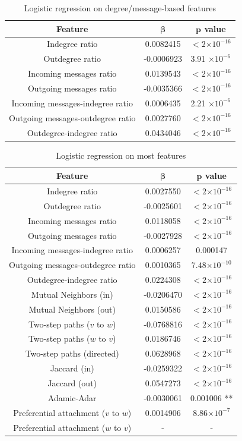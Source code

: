 \documentclass[conference]{IEEEtran}
\providecommand{\e}[1]{\ensuremath{\times 10^{#1}}}
\begin{document}
\begin{table}[!t]
\renewcommand{\arraystretch}{1.3}
\caption{Logistic regression on degree/message-based features}
\label{table_recresults_logr}
\centering
\begin{tabular}{|c||c|c|}
\hline
\bf{Feature} & $\mathbf{\beta}$ & $\mathbf{p}$ value \\
\hline
Indegree ratio & 0.0082415 & $< 2 \e{-16} $ \\
Outdegree ratio & -0.0006923 & 3.91 \e{-6} \\
Incoming messages ratio & 0.0139543 & $< 2 \e{-16} $ \\
Outgoing messages ratio & -0.0035366 & $< 2 \e{-16} $ \\
Incoming messages-indegree ratio & 0.0006435 & 2.21 \e{-6} \\
Outgoing messages-outdegree ratio & 0.0027760 & $< 2 \e{-16} $ \\
Outdegree-indegree ratio & 0.0434046 & $< 2 \e{-16} $ \\
\hline
\end{tabular}
\end{table}

\begin{table}[!t]
\renewcommand{\arraystretch}{1.3}
\caption{Logistic regression on most features}
\label{table_recresults_lograll2}
\centering
\begin{tabular}{|c||c|c|}
\hline
\bf{Feature} & $\mathbf{\beta}$ & $\mathbf{p}$ value \\
\hline
Indegree ratio     &    0.0027550  & $< 2 \e{-16} $\\
Outdegree ratio    &   -0.0025601  & $< 2 \e{-16} $\\
Incoming messages ratio    &    0.0118058  & $< 2 \e{-16} $\\
Outgoing messages ratio   &   -0.0027928  & $< 2 \e{-16} $\\
Incoming messages-indegree ratio      &   0.0006257 &  0.000147 \\
Outgoing messages-outdegree ratio   &     0.0010365 &  $7.48 \e{-10}$ \\
Outdegree-indegree ratio  &   0.0224308  & $< 2 \e{-16} $\\
\hline
Mutual Neighbors (in) & -0.0206470  &$< 2 \e{-16} $\\
Mutual Neighbors (out) & 0.0150586  & $< 2 \e{-16} $\\
Two-step paths ($v$ to $w$)  &  -0.0768816   & $< 2 \e{-16} $\\
Two-step paths ($w$ to $v$)   &    0.0186746   & $< 2 \e{-16} $\\
\hline
Two-step paths (directed)  &   0.0628968 & $< 2 \e{-16} $\\
Jaccard (in) & -0.0259322 & $< 2 \e{-16} $\\
Jaccard (out) &   0.0547273  & $< 2 \e{-16} $\\
Adamic-Adar  &    -0.0030061 & 0.001006 ** \\
Preferential attachment ($v$ to $w$) &  0.0014906  & $8.86 \e{-7}$ \\
Preferential attachment ($w$ to $v$)  &  - & -  \\
\hline
\end{tabular}
\end{table}
\end{document}
